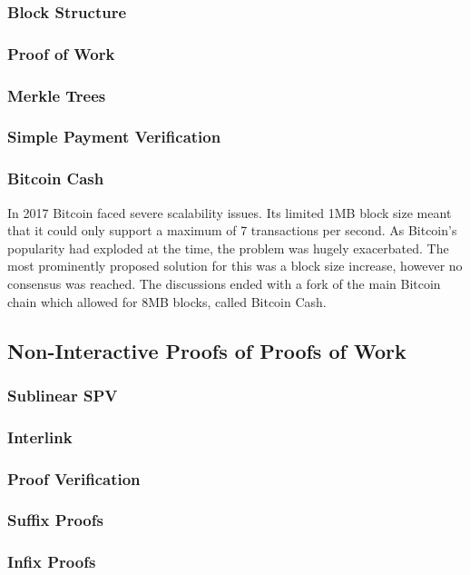 \documentclass[11pt]{llncs}
\begin{document}
\subsubsection{Block Structure}
\subsubsection{Proof of Work}
\subsubsection{Merkle Trees}
\subsubsection{Simple Payment Verification}
\subsubsection{Bitcoin Cash}
In 2017 Bitcoin faced severe scalability issues. Its limited 1MB block size meant
that it could only support a maximum of 7 transactions per second. As Bitcoin's
popularity had exploded at the time, the problem was hugely exacerbated. The
most prominently proposed solution for this was a block size increase, however
no consensus was reached. The discussions ended with a fork of the main Bitcoin
chain which allowed for 8MB blocks, called Bitcoin Cash.

\subsection{Non-Interactive Proofs of Proofs of Work}

\subsubsection{Sublinear SPV}
\subsubsection{Interlink}
\subsubsection{Proof Verification}
\subsubsection{Suffix Proofs}
\subsubsection{Infix Proofs}
\end{document}
